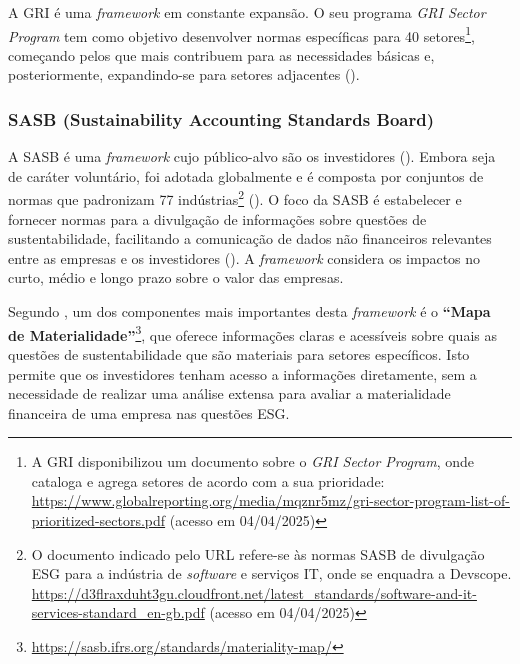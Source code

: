 A GRI é uma \textit{framework} em constante expansão. O seu programa \textit{GRI Sector Program} tem como objetivo desenvolver normas específicas para 40 setores\footnote{A GRI disponibilizou um documento sobre o \textit{GRI Sector Program}, onde cataloga e agrega setores de acordo com a sua prioridade: \url{https://www.globalreporting.org/media/mqznr5mz/gri-sector-program-list-of-prioritized-sectors.pdf} (acesso em 04/04/2025)}, começando pelos que mais contribuem para as necessidades básicas e, posteriormente, expandindo-se para setores adjacentes (\cite{GRISector2025}).


\subsubsection{SASB (Sustainability Accounting Standards Board)}
\label{subsubsec: SASB}

A \gls{SASB} é uma \textit{framework} cujo público-alvo são os investidores (\cite{GRISASB2021}). Embora seja de caráter voluntário, foi adotada globalmente e é composta por conjuntos de normas que padronizam 77 indústrias\footnote{O documento indicado pelo URL refere-se às normas SASB de divulgação ESG para a indústria de \textit{software} e serviços IT, onde se enquadra a Devscope. \url{https://d3flraxduht3gu.cloudfront.net/latest_standards/software-and-it-services-standard_en-gb.pdf} (acesso em 04/04/2025)} (\cite{SASB2025}). O foco da SASB é estabelecer e fornecer normas para a divulgação de informações sobre questões de sustentabilidade, facilitando a comunicação de dados não financeiros relevantes entre as empresas e os investidores (\cite{Goswami2023}). A \textit{framework} considera os impactos no curto, médio e longo prazo sobre o valor das empresas.

Segundo \cite{Cruz2023}, um dos componentes mais importantes desta \textit{framework} é o \textbf{“Mapa de Materialidade”}\footnote{\url{https://sasb.ifrs.org/standards/materiality-map/}}, que oferece informações claras e acessíveis sobre quais as questões de sustentabilidade que são materiais para setores específicos. Isto permite que os investidores tenham acesso a informações diretamente, sem a necessidade de realizar uma análise extensa para avaliar a materialidade financeira de uma empresa nas questões ESG.


